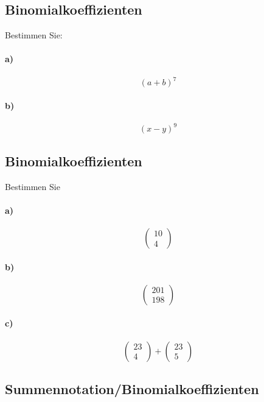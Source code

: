\documentclass[paper=a4, fontsize=11pt]{scrartcl}
\numberwithin{equation}{section}
\numberwithin{figure}{section}
\numberwithin{table}{section}
\begin{document}
\subsection{Binomialkoeffizienten}
Bestimmen Sie:
\paragraph{a)}
$$(a+b)^{7}$$

\paragraph{b)}
$$(x-y)^{9}$$

\subsection{Binomialkoeffizienten}
Bestimmen Sie
\paragraph{a)}
$$\left(\begin{array}{c} 10 \\ 4 \end{array}\right)$$

\paragraph{b)}
$$\left(\begin{array}{c} 201 \\ 198 \end{array}\right)$$

\paragraph{c)}
$$\left(\begin{array}{c} 23 \\ 4 \end{array}\right)+\left(\begin{array}{c} 23 \\ 5 \end{array}\right)$$

\subsection{Summennotation/Binomialkoeffizienten}
\end{document}
